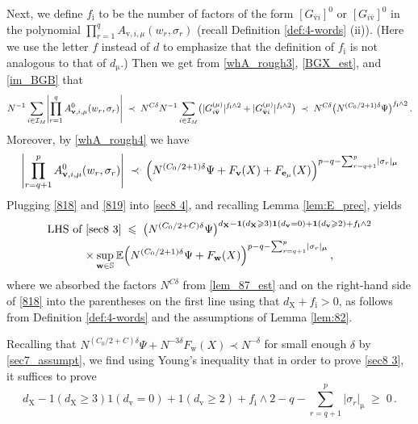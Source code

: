 \documentclass[11pt]{article} %
\newcommand{\nc}{\normalcolor}
\numberwithin{equation}{section}
\numberwithin{figure}{section}
\theoremstyle{plain} %
\theoremstyle{definition} %
\newcommand{\f}[1]{\boldsymbol{\mathrm{#1}}} %
\newcommand{\bb}{\mathbb} %
\renewcommand{\cal}{\mathcal}
\newcommand{\txt}[1]{\text{\rm{#1}}}
\newcommand{\E}{\mathbb{E}}
\renewcommand{\leq}{\leqslant}
\renewcommand{\geq}{\geqslant}
\newcommand{\ind}[1]{\f 1 (#1)}
\newcommand{\pb}[1]{\bigl({#1}\bigr)}
\newcommand{\pB}[1]{\Bigl({#1}\Bigr)}
\newcommand{\abs}[1]{\lvert #1 \rvert}
\newcommand{\absBB}[1]{\Biggl\lvert #1 \Biggr\rvert}
\begin{document}
Next, we define $f_{\f i}$ to be the number of factors of the form $[G_{\bar{\f v} i}]^0$ or $[G_{i \bar {\f v}}]^0$ in the polynomial $\prod_{r = 1}^q A_{\f v,i,\mu}(w_r, \sigma_r)$ (recall Definition \ref{def:4-words} (ii)). (Here we use the letter $f$ instead of $d$ to emphasize that the definition of $f_{\f i}$ is not analogous to that of $d_{\f \mu}$.) Then we get from \eqref{whA_rough3}, \eqref{BGX_est}, and \eqref{im_BGB} that
\begin{equation} \label{818}
N^{-1} \sum_{i \in \cal I_M} \absBB{\prod_{r = 1}^{q} A_{\f v,i,\mu}^0(w_r, \sigma_r)} \;\prec\; N^{C \delta} N^{-1}\sum_{i \in \cal I_M} \pb{\abs{G^{(\mu)}_{i \bar{\f v}}}^{f_{\f i} \wedge 2} + \abs{G_{\bar {\f v} i}^{(\mu)}}^{f_{\f i} \wedge 2}} \;\prec\;   N^{C \delta} \nc \pb{N^{(C_0/2 + 1) \delta} \Psi}^{f_{\f i} \wedge 2}\,.
\end{equation} 
Moreover, by \eqref{whA_rough4} we have
\begin{equation} \label{819}
\absBB{\prod_{r = q+1}^{p} A_{\f v,i,\mu}^0(w_r, \sigma_r)} \;\prec\; \pB{N^{(C_0/2 + 1) \delta} \Psi + F_{\f v}(X) + F_{\f e_\mu}(X)}^{p - q - \sum_{r = q+1}^p \abs{\sigma_r}_{\f \mu}}
\end{equation}
Plugging \eqref{818} and \eqref{819} into \eqref{sec8 4}, and recalling Lemma \ref{lem:E_prec}, yields
\begin{multline} \label{sec8 5}
\txt{LHS of \eqref{sec8 3}} \;\leq\; \pb{N^{(C_0/2 + C) \delta} \Psi}^{d_{\f X} - \ind{d_{\f X} \geq 3} \ind{d_{\f v} = 0} + \ind{d_{\f v} \geq 2} + f_{\f i} \wedge 2}
\\
\times  \sup_{\f w \in \bb S} \E \pB{N^{(C_0/2 + 1) \delta} \Psi + F_{\f w}(X)}^{p - q - \sum_{r = q+1}^p \abs{\sigma_r}_{\f \mu}}\,,
\end{multline}
  where we absorbed the factors $N^{C \delta}$ from \eqref{lem_87_est} and on the right-hand side of \eqref{818} into the parentheses on the first line using that $d_{\f X} + f_{\f i} > 0$, as follows from Definition \ref{def:4-words} and the assumptions of Lemma \ref{lem:82}. \nc

Recalling that $N^{(C_0/2 + C) \delta} \Psi + N^{-3 \delta} F_{\f w}(X) \prec N^{-\delta}$ for small enough $\delta$ by \eqref{sec7_assumpt}, we find using Young's inequality that in order to prove \eqref{sec8 3}, it suffices to prove
\begin{equation} \label{main_comb_est}
d_{\f X} - \ind{d_{\f X} \geq 3} \ind{d_{\f v} = 0} + \ind{d_{\f v} \geq 2} + f_{\f i} \wedge 2 - q - \sum_{r = q+1}^p \abs{\sigma_r}_{\f \mu} \;\geq\; 0\,.
\end{equation}
\end{document}
